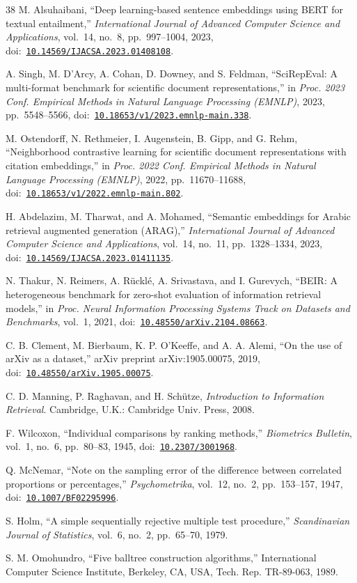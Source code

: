 \documentclass[conference, letterpaper]{IEEEtran}
\newcommand{\doi}[1]{doi:~\href{https://doi.org/#1}{\nolinkurl{#1}}}
\newcommand{\ijacsa}{\textit{International Journal of Advanced Computer Science and Applications}}
\begin{document}
\begin{thebibliography}{38}
M. Alsuhaibani, ``Deep learning-based sentence embeddings using BERT for textual entailment,'' \ijacsa, vol.~14, no.~8, pp.~997--1004, 2023, \doi{10.14569/IJACSA.2023.01408108}.

A. Singh, M. D'Arcy, A. Cohan, D. Downey, and S. Feldman, ``SciRepEval: A multi-format benchmark for scientific document representations,'' in \textit{Proc. 2023 Conf. Empirical Methods in Natural Language Processing (EMNLP)}, 2023, pp.~5548--5566, \doi{10.18653/v1/2023.emnlp-main.338}.

M. Ostendorff, N. Rethmeier, I. Augenstein, B. Gipp, and G. Rehm, ``Neighborhood contrastive learning for scientific document representations with citation embeddings,'' in \textit{Proc. 2022 Conf. Empirical Methods in Natural Language Processing (EMNLP)}, 2022, pp.~11670--11688, \doi{10.18653/v1/2022.emnlp-main.802}.

H. Abdelazim, M. Tharwat, and A. Mohamed, ``Semantic embeddings for Arabic retrieval augmented generation (ARAG),'' \ijacsa, vol.~14, no.~11, pp.~1328--1334, 2023, \doi{10.14569/IJACSA.2023.01411135}.

N. Thakur, N. Reimers, A. R\"uckl\'e, A. Srivastava, and I. Gurevych, ``BEIR: A heterogeneous benchmark for zero-shot evaluation of information retrieval models,'' in \textit{Proc. Neural Information Processing Systems Track on Datasets and Benchmarks}, vol.~1, 2021, \doi{10.48550/arXiv.2104.08663}.

C. B. Clement, M. Bierbaum, K. P. O'Keeffe, and A. A. Alemi, ``On the use of arXiv as a dataset,'' arXiv preprint arXiv:1905.00075, 2019, \doi{10.48550/arXiv.1905.00075}.

C. D. Manning, P. Raghavan, and H. Sch\"utze, \textit{Introduction to Information Retrieval}. Cambridge, U.K.: Cambridge Univ. Press, 2008.

F. Wilcoxon, ``Individual comparisons by ranking methods,'' \textit{Biometrics Bulletin}, vol.~1, no.~6, pp.~80--83, 1945, \doi{10.2307/3001968}.

Q. McNemar, ``Note on the sampling error of the difference between correlated proportions or percentages,'' \textit{Psychometrika}, vol.~12, no.~2, pp.~153--157, 1947, \doi{10.1007/BF02295996}.

S. Holm, ``A simple sequentially rejective multiple test procedure,'' \textit{Scandinavian Journal of Statistics}, vol.~6, no.~2, pp.~65--70, 1979.

S. M. Omohundro, ``Five balltree construction algorithms,'' International Computer Science Institute, Berkeley, CA, USA, Tech. Rep. TR-89-063, 1989.

\end{thebibliography}
\end{document}
